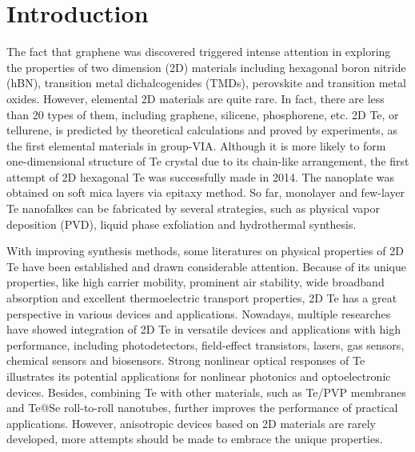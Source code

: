\documentclass[journal=jacsat,manuscript=article]{achemso}
\begin{document}
\section{Introduction}
The fact that graphene was discovered triggered intense attention in exploring the properties of two dimension (2D) materials\cite{novoselov2004electric} including hexagonal boron nitride (hBN)\cite{song2010large}, transition metal
dichalcogenides (TMDs)\cite{wang2012electronics}, perovskite\cite{RicciardulliEmergingperovskitemonolayers2021} and transition metal oxides\cite{kalantar2016two}. However, elemental 2D materials are quite rare. In fact, there are less than 20 types of them\cite{cai2020tellurene}, including graphene, silicene\cite{vogt2012silicene}, phosphorene\cite{liu2014phosphorene}, etc. 2D Te, or tellurene, is predicted by theoretical calculations and proved by experiments, as the first elemental materials in group-VIA. Although it is more likely to form one-dimensional structure of Te crystal due to its chain-like arrangement, the first attempt of 2D hexagonal Te was successfully made in 2014\cite{wang2014van}. The nanoplate was obtained on soft mica layers via epitaxy method. So far, monolayer and few-layer Te nanofalkes can be fabricated by several strategies, such as physical vapor deposition (PVD)\cite{yang2018highly,zhao2020evaporated}, liquid phase exfoliation\cite{xie2018ultrathin} and hydrothermal synthesis\cite{amani2018solution,gao2019one,lono2021local}.

With improving synthesis methods, some literatures on physical properties of 2D Te have been established and drawn considerable attention. Because of its unique properties, like high carrier mobility\cite{qiu2018quantum}, prominent air stability\cite{li2021bilayer}, wide broadband absorption\cite{zhang2019broadband} and  excellent thermoelectric transport properties\cite{peng2015anisotropic,peng2014elemental}, 2D Te has a great perspective in various devices and applications\cite{shi2020two}. Nowadays, multiple researches have showed integration of 2D Te in versatile devices and applications with high performance, including photodetectors\cite{wang2014van,amani2018solution,tong2020stable,shen2019tellurene,deckoff2019tellurene}, field-effect transistors\cite{jiang2021end,zhao2020evaporated,wang2018field,ren2019gate}, lasers\cite{zhang2020passively}, gas sensors\cite{xu2021gas,wang2018effects,cui2020tellurene}, chemical sensors\cite{wang2018effects,wang2019tellurene} and biosensors\cite{guo2020tellurene}. Strong nonlinear optical responses of Te illustrates its potential applications for nonlinear photonics and optoelectronic devices\cite{wu20192d}. Besides, combining Te with other materials, such as Te/PVP membranes\cite{guo2019two} and Te@Se roll-to-roll nanotubes\cite{huang2019enhanced}, further improves the performance of practical applications. However, anisotropic devices based on 2D materials are rarely developed\cite{xin2020polarization,yuan2015polarization}, more attempts should be made to embrace the unique properties. 
\end{document}

